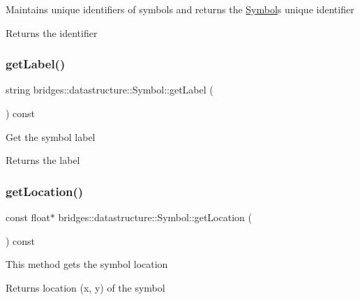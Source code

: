 Maintains unique identifiers of symbols and returns the \hyperlink{classbridges_1_1datastructure_1_1_symbol}{Symbol}\textquotesingle{}s unique identifier

\begin{DoxyReturn}{Returns}
the identifier 
\end{DoxyReturn}
\mbox{\label{classbridges_1_1datastructure_1_1_symbol_a549906b96da5d53b964844ca5f593b7f}} 
\subsubsection{\texorpdfstring{get\+Label()}{getLabel()}}
{\footnotesize\ttfamily string bridges\+::datastructure\+::\+Symbol\+::get\+Label (\begin{DoxyParamCaption}{ }\end{DoxyParamCaption}) const\hspace{0.3cm}{\ttfamily [inline]}}

Get the symbol label

\begin{DoxyReturn}{Returns}
the label 
\end{DoxyReturn}
\mbox{\label{classbridges_1_1datastructure_1_1_symbol_a6ab847b892f510e185f2aebb9302bc82}} 
\subsubsection{\texorpdfstring{get\+Location()}{getLocation()}}
{\footnotesize\ttfamily const float$\ast$ bridges\+::datastructure\+::\+Symbol\+::get\+Location (\begin{DoxyParamCaption}{ }\end{DoxyParamCaption}) const\hspace{0.3cm}{\ttfamily [inline]}}

This method gets the symbol location

\begin{DoxyReturn}{Returns}
location (x, y) of the symbol 
\end{DoxyReturn}
\mbox{\label{classbridges_1_1datastructure_1_1_symbol_a9365f8d91faf67e14ceaa89f8a5d0338}} 
